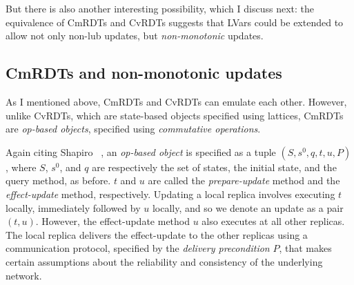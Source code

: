 \documentclass{article}
\begin{document}
But there is also another interesting possibility, which I discuss
next: the equivalence of CmRDTs and CvRDTs suggests that LVars could
be extended to allow not only non-lub updates, but
\emph{non-monotonic} updates.

\subsection{CmRDTs and non-monotonic updates}

As I mentioned above, CmRDTs and CvRDTs can emulate each other.
However, unlike CvRDTs, which are state-based objects specified using
lattices, CmRDTs are \emph{op-based objects}, specified using
\emph{commutative operations}.

Again citing Shapiro \etal~\cite{crdts, crdts-tr}, an \emph{op-based
  object} is specified as a tuple $(S, s^0, q, t, u, P)$, where $S$,
$s^0$, and $q$ are respectively the set of states, the initial state,
and the query method, as before. $t$ and $u$ are called the
\emph{prepare-update} method and the \emph{effect-update} method,
respectively.  Updating a local replica involves executing $t$
locally, immediately followed by $u$ locally, and so we denote an
update as a pair $(t, u)$.  However, the effect-update method $u$ also
executes at all other replicas.  The local replica delivers the
effect-update to the other replicas using a communication protocol,
specified by the \emph{delivery precondition} $P$, that makes certain
assumptions about the reliability and consistency of the underlying
network.
\end{document}
